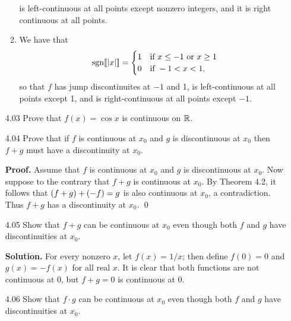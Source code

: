 \begin{enumerate}
\begin{enumerate}
               is left-continuous at all points except nonzero integers, and it
               is right continuous at all points.
         \item We have that
               \begin{equation*}
                  \text{sgn}\lbrack\!\lbrack |x| \rbrack\!\rbrack = \begin{cases}
                      1 & \text{if } x \le -1 \text{ or } x \ge 1 \\
                      0 & \text{if } -1 < x < 1,
                  \end{cases}
               \end{equation*}
               so that $f$ has jump discontinuites at $-1$ and 1, is
               left-continuous at all points except 1, and is right-continuous
               at all points except $-1$.
      \end{enumerate}
   \item[4.03] Prove that $f(x) = \cos {x}$ is continuous on $\mathbb{R}$.
   \item[4.04] Prove that if $f$ is continuous at $x_0$ and $g$ is discontinuous
               at $x_0$ then $f + g$ must have a discontinuity at $x_0$.

      \textbf{Proof.} Assume that $f$ is continuous at $x_0$ and $g$ is 
      discontinuous at $x_0$. Now suppose to the contrary that $f + g$ is
      continuous at $x_0$. By Theorem 4.2, it follows that
      $(f +\nobreak g) +\nobreak (-f) = g$ is also continuous at $x_0$, a 
      contradiction. Thus $f + g$ has a
      discontinuity at $x_0$. \qed
   \item[4.05] Show that $f + g$ can be continuous at $x_0$ even though both $f$
               and $g$ have discontinuities at $x_0$.

      \textbf{Solution.} For every nonzero $x$, let $f(x) = 1/x$; then define
      $f(0) = 0$ and $g(x) = -f(x)$ for all real $x$. It is clear that both 
      functions are not continuous at 0, but $f + g = 0$ is continuous at 0.
   \item[4.06] Show that $f \cdot g$ can be continuous at $x_0$ even though 
               both $f$ and $g$ have discontinuities at $x_0$.


\end{enumerate}
